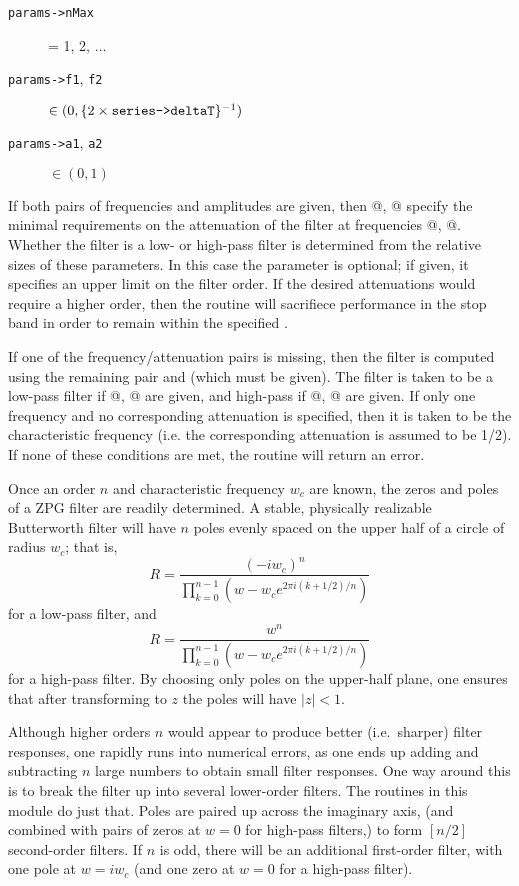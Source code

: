 \begin{description}
\item[\texttt{params->nMax}]   = 1, 2, $\ldots$
\item[\texttt{params->f1}, \texttt{f2}] $\in
  (0,\{2\times\verb@series->deltaT@\}^{-1}) $
\item[\texttt{params->a1}, \texttt{a2}] $\in (0,1) $
\end{description}

If both pairs of frequencies and amplitudes are given, then @,
@ specify the minimal requirements on the attenuation of the
filter at frequencies @, @.  Whether the filter is a
low- or high-pass filter is determined from the relative sizes of
these parameters.  In this case the \verb@nMax@ parameter is optional;
if given, it specifies an upper limit on the filter order.  If the
desired attenuations would require a higher order, then the routine
will sacrifiece performance in the stop band in order to remain within
the specified \verb@nMax@.

If one of the frequency/attenuation pairs is missing, then the filter
is computed using the remaining pair and \verb@nMax@ (which must be
given).  The filter is taken to be a low-pass filter if @,
@ are given, and high-pass if @, @ are given.
If only one frequency and no corresponding attenuation is specified,
then it is taken to be the characteristic frequency (i.e. the
corresponding attenuation is assumed to be 1/2).  If none of these
conditions are met, the routine will return an error.

Once an order $n$ and characteristic frequency $w_c$ are known, the
zeros and poles of a ZPG filter are readily determined.  A stable,
physically realizable Butterworth filter will have $n$ poles evenly
spaced on the upper half of a circle of radius $w_c$; that is,
$$
R = \frac{(-iw_c)^n}{\prod_{k=0}^{n-1}(w - w_c e^{2\pi i(k+1/2)/n})}
$$
for a low-pass filter, and
$$
R = \frac{w^n}{\prod_{k=0}^{n-1}(w - w_c e^{2\pi i(k+1/2)/n})}
$$
for a high-pass filter.  By choosing only poles on the upper-half
plane, one ensures that after transforming to $z$ the poles will have
$|z|<1$.

Although higher orders $n$ would appear to produce better (i.e.\
sharper) filter responses, one rapidly runs into numerical errors, as
one ends up adding and subtracting $n$ large numbers to obtain small
filter responses.  One way around this is to break the filter up into
several lower-order filters.  The routines in this module do just
that.  Poles are paired up across the imaginary axis, (and combined
with pairs of zeros at $w=0$ for high-pass filters,) to form $[n/2]$
second-order filters.  If $n$ is odd, there will be an additional
first-order filter, with one pole at $w=iw_c$ (and one zero at $w=0$
for a high-pass filter).

